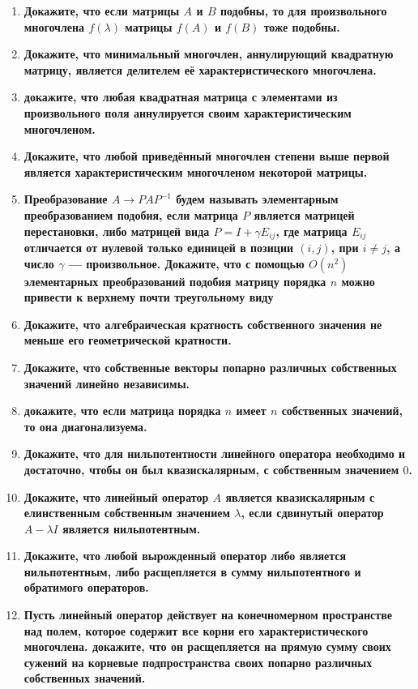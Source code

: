 \documentclass[12pt]{article} %
\begin{document}
\begin{enumerate}
    \item \textbf{Докажите, что если матрицы $A$ и $B$ подобны, то для произвольного многочлена $f(\lambda)$ матрицы $f(A)$ и $f(B)$ тоже подобны.}
    \item \textbf{Докажите, что минимальный многочлен, аннулирующий квадратную матрицу, является делителем её характеристического многочлена.}
    \item \textbf{докажите, что любая квадратная матрица с элементами из произвольного поля аннулируется своим характеристическим многочленом.}
    \item \textbf{Докажите, что любой приведённый многочлен степени выше первой является характеристическим многочленом некоторой матрицы.}
    \item \textbf{Преобразование $A \rightarrow PAP^{-1}$ будем называть элементарным преобразованием подобия, если матрица $P$ является матрицей перестановки, либо матрицей вида $P = I + \gamma E_{ij}$, где матрица $E_{ij} $ отличается от нулевой только единицей в позиции $(i, j)$, при $i \neq j$, а число $\gamma$ --- произвольное. Докажите, что с помощью $O(n^2)$ элементарных преобразований подобия матрицу порядка $n$ можно привести к верхнему почти треугольному виду}%
    \item \textbf{Докажите, что алгебраическая кратность собственного значения не меньше его геометрической кратности.}
    \item \textbf{Докажите, что собственные векторы попарно различных собственных значений линейно независимы.}
    \item \textbf{докажите, что если матрица порядка $n$ имеет $n$ собственных значений, то она диагонализуема.}
    \item \textbf{Докажите, что для нильпотентности линейного оператора необходимо и достаточно, чтобы он был квазискалярным, с собственным значением $0$.}
    \item \textbf{Докажите, что линейный оператор  $A$ является квазискалярным с елинственным собственным значением $\lambda$, если сдвинутый оператор $A - \lambda I$ является нильпотентным.}
    \item \textbf{Докажите, что любой вырожденный оператор либо является нильпотентным, либо расщепляется в сумму нильпотентного и обратимого операторов.}
    \item \textbf{Пусть линейный оператор действует на конечномерном пространстве над полем, которое содержит все корни его характеристического многочлена. докажите, что он расщепляется на прямую сумму своих сужений на корневые подпространства своих попарно различных собственных значений.}

\end{enumerate}
\end{document}
